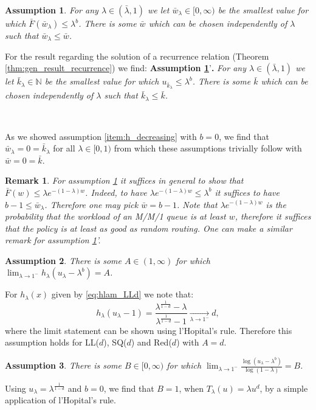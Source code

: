 \documentclass[12pt]{report}
\newtheorem{remark}{Remark}
\newtheorem{assumption}{Assumption}
\begin{document}
\begin{assumption}\label{item:ODE_only_new_req}
For any $\lambda \in (\bar \lambda, 1)$ we let $\bar w_\lambda \in [0,\infty)$ be the smallest value for which $\bar F(\bar w_\lambda) \leq \lambda^b$. There is some $\bar w$ which can be chosen independently of $\lambda$ such that $\bar w_\lambda \leq \bar w$.
\end{assumption}
For the result regarding the solution of a recurrence relation (Theorem \ref{thm:gen_result_recurrence}) we find:\newline
\textbf{Assumption \ref{item:ODE_only_new_req}}'\textbf{.} \textit{For any $\lambda \in (\bar \lambda, 1)$ we let $\bar k_\lambda \in \mathbb{N}$ be the smallest value for which $u_{\bar k_\lambda} \leq \lambda^b$. There is some $\bar k$ which can be chosen independently of $\lambda$ such that $\bar k_\lambda \leq \bar k$.}

\

As we showed assumption \ref{item:h_decreasing} with $b=0$, we find that $\bar w_\lambda=0 = \bar k_\lambda$ for all $\lambda \in [0,1)$ from which these assumptions trivially follow with $\bar w = 0 = \bar k$.
\begin{remark}
For assumption \ref{item:ODE_only_new_req} it suffices in general to show that $\bar F(w) \leq \lambda e^{-(1-\lambda) w }$. Indeed, to have $\lambda e^{-(1-\lambda) w} \leq \lambda^b$ it suffices to have $b-1  \leq \bar w_\lambda$. Therefore one may pick $\bar w=b-1$. Note that $\lambda e^{-(1-\lambda)w}$ is the probability that the workload of an M/M/1 queue is at least $w$, therefore it suffices that the policy is at least as good as random routing. One can make a similar remark for assumption \ref{item:ODE_only_new_req}'.
\end{remark}

\begin{assumption} \label{item:lim_hlam}
There is some $A \in (1,\infty)$ for which $\lim_{\lambda\rightarrow 1^-} h_\lambda(u_\lambda-\lambda^b)=A$.
\end{assumption}
For $h_\lambda(x)$ given by \eqref{eq:hlam_LLd} we note that:
$$
h_\lambda(u_\lambda - 1)=\frac{\lambda^{\frac{1}{1-d}}-\lambda}{\lambda^{\frac{1}{1-d}}-1} \underset{\lambda \rightarrow 1^-}{\longrightarrow} d,
$$
where the limit statement can be shown using l'Hopital's rule. Therefore this assumption holds for LL($d$), SQ($d$) and Red($d$) with $A=d$.

\begin{assumption}\label{item:lim_ulam}
There is some $B \in [0,\infty)$ for which $\lim_{\lambda\rightarrow 1^-} \frac{\log(u_\lambda-\lambda^b)}{\log(1-\lambda)}=B$.
\end{assumption}
Using $u_\lambda = \lambda^{\frac{1}{1-d}}$ and $b=0$, we find that $B=1$, when
$T_\lambda(u)= \lambda u^d$, by a simple application of l'Hopital's rule.
\end{document}
